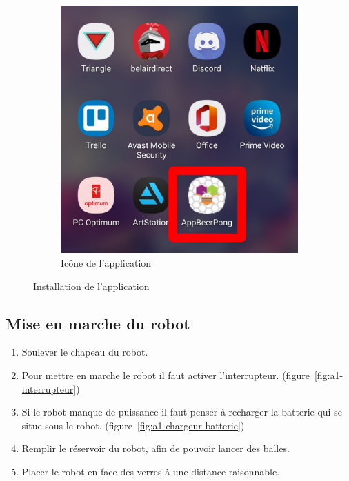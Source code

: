 \begin{figure}[h!]
\begin{subfigure}{0.2\linewidth}
        \includegraphics[width=\linewidth]{img/a1/app-icon}
        \caption{Icône de l’application}
        \label{fig:a1-app-icon}
    \end{subfigure}

    \caption{Installation de l’application}
    \label{fig:a1-install-app}
\end{figure}

\subsection{Mise en marche du robot}

\begin{enumerate}
    \item Soulever le chapeau du robot. 
    \item Pour mettre en marche le robot il faut activer l’interrupteur. (figure~\ref{fig:a1-interrupteur})
    \item Si le robot manque de puissance il faut penser à recharger la batterie qui se situe sous le robot. (figure~\ref{fig:a1-chargeur-batterie})
    \item Remplir le réservoir du robot, afin de pouvoir lancer des balles.
    \item Placer le robot en face des verres à une distance raisonnable.
\end{enumerate}

